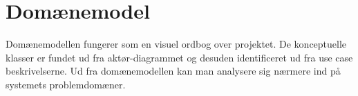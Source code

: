\section{Domænemodel}
\label{sec:Domainmodel}

Domænemodellen fungerer som en visuel ordbog over projektet. De konceptuelle klasser er fundet ud fra aktør-diagrammet og desuden identificeret ud fra use case beskrivelserne. Ud fra domænemodellen kan man analysere sig nærmere ind på systemets problemdomæner.

